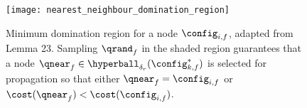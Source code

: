 







\begin{figure}
    \centering
    \texttt{[image: nearest\_neighbour\_domination\_region]}
    \caption{Minimum domination region for a node $\config_{i,f}$, adapted from \cite{LiAOKP2016} Lemma 23. Sampling $\qrand_f$ in the shaded region guarantees that a node $\qnear_f \in \hyperball_{\delta_r}(\config_{k,f}^*)$ is selected for propagation so that either $\qnear_f = \config_{i,f}$ or $\cost(\qnear_f) < \cost(\config_{i,f})$.}
    \label{fig:Yanbo_lemma_23_figure}
\end{figure}